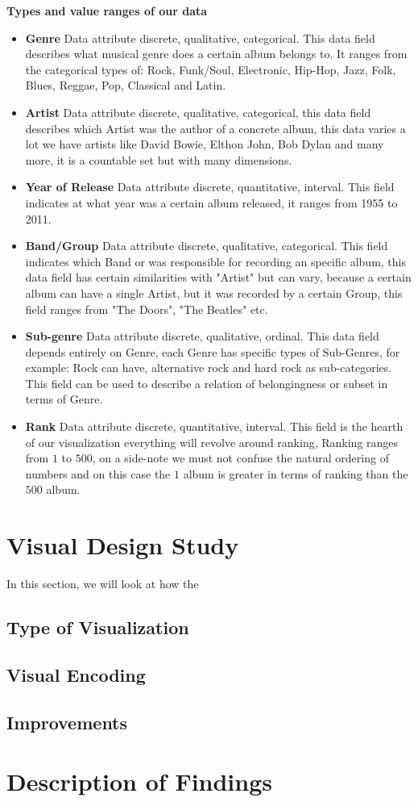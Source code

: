 \documentclass{article}
\begin{document}
\textbf{Types and value ranges of our data}
\begin{itemize} 
    \item \textbf{Genre} Data attribute discrete, qualitative, categorical. This data field describes what musical genre does a certain album belongs to. It ranges from the categorical types of: Rock, Funk/Soul, Electronic, Hip-Hop, Jazz, Folk, Blues, Reggae, Pop, Classical and Latin.
    \item \textbf{Artist} Data attribute discrete, qualitative, categorical, this data field describes which Artist was the author of a concrete album, this data varies a lot we have artists like David Bowie, Elthon John, Bob Dylan and many more, it is a countable set but with many dimensions.
    \item \textbf{Year of Release} Data attribute discrete, quantitative, interval. This field indicates at what year was a certain album released, it ranges from 1955 to 2011.
    \item \textbf{Band/Group} Data attribute discrete, qualitative, categorical. This field indicates which Band or was responsible for recording an specific album, this data field has certain similarities with "Artist" but can vary, because a certain album can have a single Artist, but it was recorded by a certain Group, this field ranges from "The Doors", "The Beatles" etc.
    \item \textbf{Sub-genre} Data attribute discrete, qualitative, ordinal. This data field depends entirely on Genre, each Genre has specific types of Sub-Genres, for example: Rock can have, alternative rock and hard rock as sub-categories. This field can be used to describe a relation of belongingness or subset in terms of Genre.
    \item \textbf{Rank} Data attribute discrete, quantitative, interval. This field is the hearth of our visualization everything will revolve around ranking, Ranking ranges from $1$ to $500$, on a side-note we must not confuse the natural ordering of numbers and on this case the $1$ album is greater in terms of ranking than the $500$ album. 
    
\end{itemize}

\section{Visual Design Study}
In this section, we will look at how the 
\subsection{Type of Visualization}
\subsection{Visual Encoding}
\subsection{Improvements}

\section{Description of Findings}



    
\end{document}

